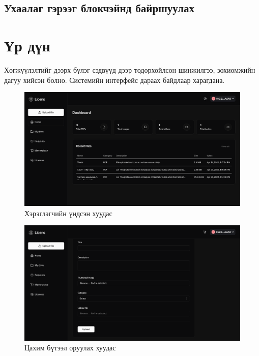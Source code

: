 \subsection{Ухаалаг гэрээг блокчэйнд байршуулах}



\pagebreak
\section{Үр дүн}
Хөгжүүлэлтийг дээрх бүлэг сэдвүүд дээр тодорхойлсон шинжилгээ, зохиомжийн дагуу хийсэн болно. Системийн интерфейс дараах байдлаар харагдана.

\begin{figure}[h!]
	\centering
	\includegraphics[scale=0.15]{src/images/dashboard.png}
	\caption{Хэрэглэгчийн үндсэн хуудас}
\end{figure}

\begin{figure}[h!]
	\centering
	\includegraphics[scale=0.15]{src/images/upload.png}
	\caption{Цахим бүтээл оруулах хуудас}
\end{figure}

